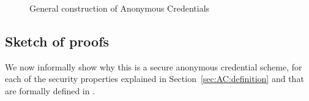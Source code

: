 \begin{figure*}
\begin{pcvstack}[center]
\begin{pchstack}
	\end{pchstack}
	\pcvspace
	\begin{pchstack}
		\pchspace[2em]
	\end{pchstack}
\end{pcvstack}
\caption{\label{fig:general_construction_AC}General construction of Anonymous Credentials}
\end{figure*}

\subsection{Sketch of proofs}\label{sec:sketch_proof_secu_AC}

We now informally show why this is a secure anonymous credential scheme, 
for each of the security properties explained in 
Section~\ref{sec:AC:definition} and that are formally defined in 
\cite[Appendix G.1]{ISC:BosCamNev18}.


